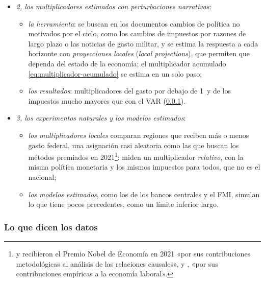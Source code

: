 \documentclass[11pt]{article}
\begin{document}
\begin{itemize}
\begin{itemize}
\begin{itemize}
    \end{itemize}
  \item \emph{2, los multiplicadores estimados con perturbaciones narrativas}:
    \begin{itemize}
    \item \emph{la herramienta}: se buscan en los documentos cambios de política no motivados por el ciclo, como los cambios de impuestos por razones de largo plazo\nocite{RomerRomer2010Tax} o las noticias de gasto militar\nocite{Ramey2011Timing}, y se estima la respuesta a cada horizonte con \emph{proyecciones locales} (\emph{local projections}), que permiten que dependa del estado de la economía\nocite{AuerbachGorodnichenko2012,RameyZubairy2018}; el multiplicador acumulado \eqref{eq:multiplicador-acumulado} se estima en un solo paso;
    \item \emph{los resultados}: multiplicadores del gasto por debajo de 1~y de los impuestos mucho mayores que con el VAR (\ref{sec:resultados}).
    \end{itemize}
  \item \emph{3, los experimentos naturales y los modelos estimados}:
    \begin{itemize}
    \item \emph{los multiplicadores locales} comparan regiones que reciben más o menos gasto federal\nocite{NakamuraSteinsson2014}, una asignación casi aleatoria como las que buscan los métodos premiados en 2021\footnote{ y  recibieron el Premio Nobel de Economía en 2021 «por sus contribuciones metodológicas al análisis de las relaciones causales», y , «por sus contribuciones empíricas a la economía laboral»\nocite{Nobel2021CardAngristImbens}.}: miden un multiplicador \emph{relativo}, con la misma política monetaria y los mismos impuestos para todos, que no es el nacional;
    \item \emph{los modelos estimados}, como los de los bancos centrales y el FMI, simulan lo que tiene pocos precedentes, como un límite inferior largo\nocite{Coenen2012Multiplicadores}.
    \end{itemize}
  \end{itemize}
\end{itemize}

\subsubsection{Lo que dicen los datos}\label{sec:resultados}
\end{document}
